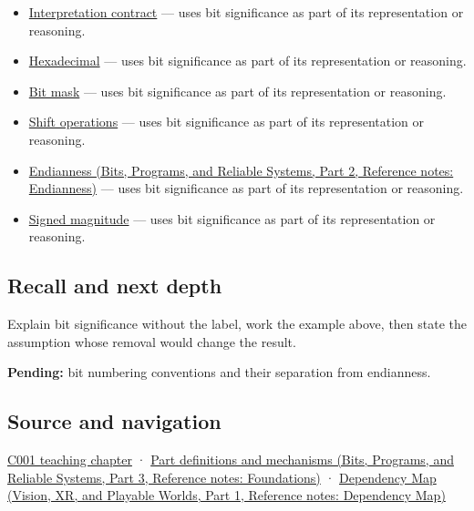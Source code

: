 \begin{itemize}
\tightlist
\item
  \hyperref[appendix-f414bd4ed05c]{Interpretation contract} --- uses bit significance as part of its representation or reasoning.
\item
  \hyperref[appendix-6b8075763724]{Hexadecimal} --- uses bit significance as part of its representation or reasoning.
\item
  \hyperref[appendix-dbe5905163c2]{Bit mask} --- uses bit significance as part of its representation or reasoning.
\item
  \hyperref[appendix-73425b25118e]{Shift operations} --- uses bit significance as part of its representation or reasoning.
\item
  \href{../01-Bits-Programs-and-Reliable-Systems-P02/main.pdf\#appendix-bc07c3d25b18}{Endianness (Bits, Programs, and Reliable Systems, Part 2, Reference notes: Endianness)} --- uses bit significance as part of its representation or reasoning.
\item
  \hyperref[appendix-ce20506c8532]{Signed magnitude} --- uses bit significance as part of its representation or reasoning.
\end{itemize}

\subsection{Recall and next depth}\label{appendix-280445746493-recall-and-next-depth}

\hypertarget{appendix-280445746493-recall-and-next-depth}{}

Explain bit significance without the label, work the example above, then state the assumption whose removal would change the result.

\textbf{Pending:} bit numbering conventions and their separation from endianness.

\subsection{Source and navigation}\label{appendix-280445746493-source-and-navigation}

\hypertarget{appendix-280445746493-source-and-navigation}{}

\hyperref[01-foundations-i-ch001-from-a-signal-to-an-interpretation]{C001 teaching chapter} · \href{../01-Bits-Programs-and-Reliable-Systems-P03/main.pdf\#appendix-fd090d982a15}{Part definitions and mechanisms (Bits, Programs, and Reliable Systems, Part 3, Reference notes: Foundations)} · \href{../07-Vision-XR-and-Playable-Worlds-P01/main.pdf\#appendix-4ad47bdd269a}{Dependency Map (Vision, XR, and Playable Worlds, Part 1, Reference notes: Dependency Map)}
